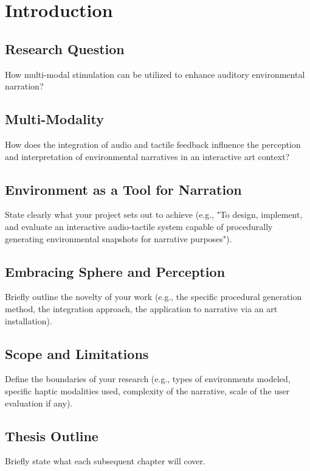 \chapter{Introduction}
    \section{Research Question} How multi-modal stimulation can be utilized to enhance auditory environmental narration?
    \section{Multi-Modality} How does the integration of audio and tactile feedback influence the perception and interpretation of environmental narratives in an interactive art context?
    \section{Environment as a Tool for Narration} State clearly what your project sets out to achieve (e.g., "To design, implement, and evaluate an interactive audio-tactile system capable of procedurally generating environmental snapshots for narrative purposes").
    \section{Embracing Sphere and Perception} Briefly outline the novelty of your work (e.g., the specific procedural generation method, the integration approach, the application to narrative via an art installation).
    \section{Scope and Limitations} Define the boundaries of your research (e.g., types of environments modeled, specific haptic modalities used, complexity of the narrative, scale of the user evaluation if any).
    \section{Thesis Outline} Briefly state what each subsequent chapter will cover.
